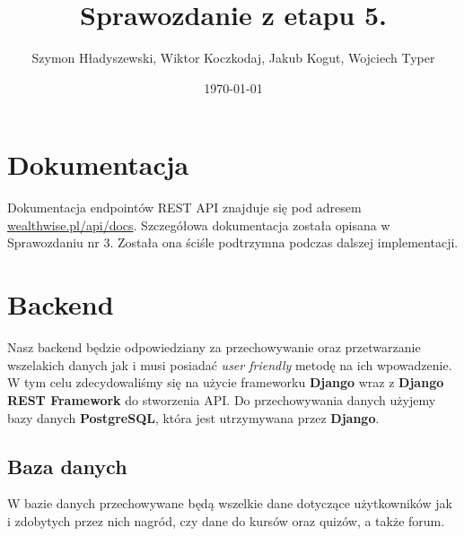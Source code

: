 \documentclass[11pt,a4paper]{article}
\title{Sprawozdanie z etapu 5.}
\author{Szymon Hładyszewski, Wiktor Koczkodaj, Jakub Kogut, Wojciech Typer}
\date{\today}
\numberwithin{equation}{section}
\begin{document}
\maketitle
\section{Dokumentacja}
Dokumentacja endpointów REST API znajduje się pod adresem \url{wealthwise.pl/api/docs}. Szczegółowa dokumentacja została opisana w Sprawozdaniu nr 3. Została ona ściśle podtrzymna podczas dalszej implementacji.
\section{Backend}
Nasz backend będzie odpowiedziany za przechowywanie oraz przetwarzanie wszelakich danych jak i musi posiadać \textit{user friendly} metodę na ich wpowadzenie. W tym celu zdecydowaliśmy się na użycie frameworku \textbf{Django} wraz z \textbf{Django REST Framework} do stworzenia API. Do przechowywania danych użyjemy bazy danych \textbf{PostgreSQL}, która jest utrzymywana przez \textbf{Django}.
\subsection{Baza danych}
W bazie danych przechowywane będą wszelkie dane dotyczące użytkowników jak i zdobytych przez nich nagród, czy dane do kursów oraz quizów, a także forum.
\end{document}
